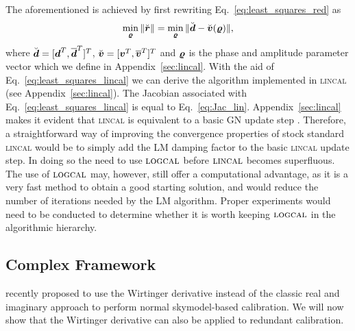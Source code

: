 \documentclass[useAMS,usenatbib]{mn2e}
\newcommand{\bz}{\bmath{z}}
\newcommand{\br}{\bmath{r}}
\newcommand{\bg}{\bmath{g}}
\newcommand{\bd}{\bmath{d}}
\newcommand{\bv}{\bmath{v}}
\newcommand{\by}{\bmath{y}}
\newcommand{\conj}[1]{\overline{#1}}
\begin{document}
The aforementioned is achieved by first rewriting Eq.~\eqref{eq:least_squares_red} as
\begin{equation}
\label{eq:least_squares_lincal}
\min_{\bmath{\varrho}} \|\breve{\br}\| = \min_{\bmath{\varrho}} \|\breve{\bd} - \breve{\bv}(\bmath{\varrho})\|, 
\end{equation}
where $\breve{\bd} = [\bd^T,\conj{\bd}^T]^T$, $\breve{\bv} = [\bv^T,\conj{\bv}^T]^T$ and $\bmath{\varrho}$ is the phase and amplitude parameter vector which we define in Appendix~\ref{sec:lincal}. 
With the aid of Eq.~\eqref{eq:least_squares_lincal} we can derive the algorithm implemented in \textsc{lincal} (see Appendix~\ref{sec:lincal}).
The Jacobian associated with Eq.~\eqref{eq:least_squares_lincal} is equal to Eq.~\eqref{eq:Jac_lin}. 
Appendix~\ref{sec:lincal} makes it evident that \textsc{lincal} is equivalent to a basic GN update step \citep{Kurien2016}. 
Therefore, a straightforward way of improving the convergence properties of stock standard \textsc{lincal} would be to simply add the LM damping factor to the basic \textsc{lincal} update step.
In doing so the need to use $\textsc{logcal}$ before $\textsc{lincal}$ becomes superfluous. The use of $\textsc{logcal}$ may, however, still offer 
a computational advantage, as it is a very fast method to obtain a good starting solution, and would reduce the number of iterations needed by the LM algorithm.
Proper experiments would need to be conducted to determine whether it is worth keeping $\textsc{logcal}$ in the algorithmic hierarchy. 

\subsection{Complex Framework}
\label{sec:w}

\citet{Smirnov2015} recently proposed to use the Wirtinger derivative instead of the classic real and imaginary approach to perform normal skymodel-based calibration. We will now show
that the Wirtinger derivative can also be applied to redundant calibration.

\end{document}
